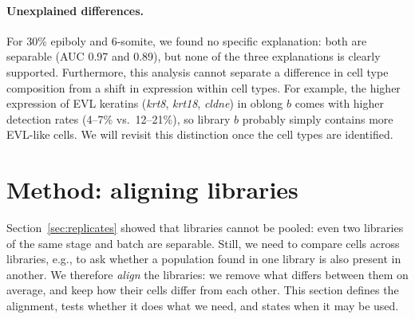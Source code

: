 \documentclass[11pt,a4paper]{article}
\begin{document}
\paragraph{Unexplained differences.} For 30\% epiboly and 6-somite, we found no specific explanation: both are separable (AUC 0.97 and 0.89), but none of the three explanations is clearly supported. Furthermore, this analysis cannot separate a difference in cell type composition from a shift in expression within cell types. For example, the higher expression of EVL keratins (\emph{krt8}, \emph{krt18}, \emph{cldne}) in oblong $b$ comes with higher detection rates (4--7\% vs.\ 12--21\%), so library $b$ probably simply contains more EVL-like cells. We will revisit this distinction once the cell types are identified.

\begin{table}[t]
	\centering
	\small
	\caption{Summary of the $a$/$b$ differences. On/off genes are detected in at least 40\% of the cells of one library and at most 10\% of the other (after depth matching). Ribosomal \% is the median share of UMIs from ribosomal protein genes. Shifts are in stage steps, positive if library $b$ is older; n/a if the indicator does not change between the pair and the reference stage. Timing is ``$a$/$b$ older'' if both shifts agree and are at least 0.1, ``weak'' if they agree but one is smaller, and ``conflicting'' if they disagree. Reference stages: dome (high, oblong), shield (30\% epiboly), 60\% epiboly DS4 (50\% epiboly), 90\% epiboly DS2 (bud) and 3-somite (6-somite).}
	\label{tab:replicate-summary}
	\setlength{\tabcolsep}{4pt}
	
\end{table}

\section{Method: aligning libraries}
\label{sec:alignment}

Section~\ref{sec:replicates} showed that libraries cannot be pooled: even two libraries of the same stage and batch are separable. Still, we need to compare cells across libraries, e.g., to ask whether a population found in one library is also present in another. We therefore \emph{align} the libraries: we remove what differs between them on average, and keep how their cells differ from each other. This section defines the alignment, tests whether it does what we need, and states when it may be used.
\end{document}
